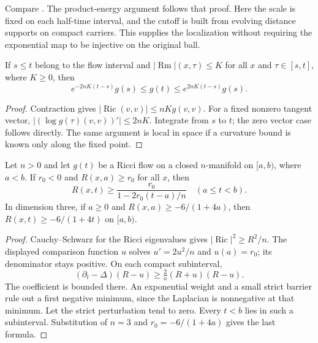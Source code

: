Compare \cite[Theorems 3.28--3.29 and their proof, pp.~51--57]{MT2007}.
The product-energy argument follows that proof.  Here the scale is
fixed on each half-time interval, and the cutoff is built from evolving
distance supports on compact carriers.  This supplies the localization
without requiring the exponential map to be injective on the original
ball.

\begin{proposition}\label{prop:rf-metric-comparison}
If $s\leq t$ belong to the flow interval and
$|\operatorname{Rm}|(x,\tau)\leq K$ for all $x$ and $\tau\in[s,t]$, where
$K\geq0$, then
\[
 e^{-2nK(t-s)}g(s)\leq g(t)\leq e^{2nK(t-s)}g(s).
\]
\end{proposition}
\begin{proof}
Contraction gives $|\operatorname{Ric}(v,v)|\leq nK g(v,v)$.
For a fixed nonzero tangent vector,
$|(\log g(\tau)(v,v))'|\leq2nK$.  Integrate from $s$ to $t$;
the zero vector case follows directly.  The same argument is local in
space if a curvature bound is known only along the fixed point.
\end{proof}

\begin{proposition}\label{prop:rf-scalar}
Let $n>0$ and let $g(t)$ be a Ricci flow on a closed $n$-manifold on
$[a,b)$, where $a<b$.  If $r_0<0$ and $R(x,a)\geq r_0$ for all $x$, then
\[
 R(x,t)\geq \frac{r_0}{1-2r_0(t-a)/n}\quad(a\leq t<b).
\]
In dimension three, if $a\geq0$ and $R(x,a)\geq-6/(1+4a)$, then
$R(x,t)\geq-6/(1+4t)$ on $[a,b)$.
\end{proposition}
\begin{proof}
Cauchy--Schwarz for the Ricci eigenvalues gives
$|\operatorname{Ric}|^2\geq R^2/n$.  The displayed comparison function
$u$ solves $u'=2u^2/n$ and $u(a)=r_0$; its denominator stays positive.
On each compact subinterval,
\[
 (\partial_t-\Delta)(R-u)\geq \tfrac2n(R+u)(R-u).
\]
The coefficient is bounded there.  An exponential weight and a small
strict barrier rule out a first negative minimum, since the Laplacian
is nonnegative at that minimum.  Let the strict perturbation tend to
zero.  Every $t<b$ lies in such a subinterval.  Substitution of
$n=3$ and $r_0=-6/(1+4a)$ gives the last formula.
\end{proof}

